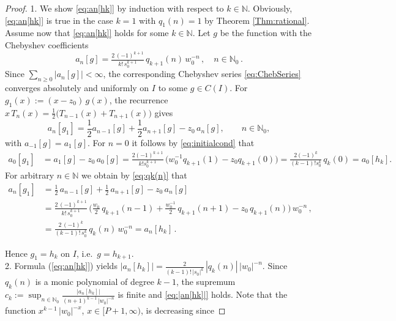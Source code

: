 \documentclass[11pt,a4paper]{scrartcl}
\numberwithin{equation}{section}
\numberwithin{table}{section}
\numberwithin{figure}{section}
\newcommand{\Np}{{\mathbb N}_0}
\begin{document}
\begin{proof} 1. We show \eqref{eq:an[hk]} by induction with respect to $k \in \mathbb N$. Obviously, \eqref{eq:an[hk]} is true in the case $k =1$ with $q_1(n)=1$ by Theorem \ref{Thm:rational}. Assume now that
\eqref{eq:an[hk]} holds for some $k \in \mathbb N$. Let $g$ be the function with the Chebyshev coefficients
$$
a_n[g] = \tfrac{2\,(-1)^{k+1}}{k!\,s_0^{k+1}}\,q_{k+1}(n)\,w_0^{-n}\,,\quad n\in {\mathbb N}_0\,.
$$
Since $\sum_{n\ge0}|a_n[g]| < \infty$, the corresponding Chebyshev series \eqref{eq:ChebSeries}
converges absolutely and uniformly on $I$ to some $g \in C(I)$. For $g_1(x) := (x-z_0)\,g(x)$,
the recurrence $x\,T_n(x) = \frac12\big(T_{n-1}(x)+T_{n+1}(x)\big)$ gives 
$$ \textstyle a_n[g_1] = \frac12 a_{n-1}[g] + \frac12 a_{n+1}[g] - z_0\,a_n[g], \qquad n \in \Np, $$
 with
$a_{-1}[g] = a_1[g]$.   For $n=0$ it follows by \eqref{eq:initialcond} that
\begin{align*}
\textstyle a_0[g_1] &= a_1[g] \!- \!z_0\,a_0[g] =
 \tfrac{2(-1)^{k+1}}{k!s_0^{k+1}}\,\big(w_0^{-1}q_{k+1}(1) \!- \!z_0q_{k+1}(0)\big)
= \tfrac{2(-1)^k}{(k-1)!s_0^k}\,q_k(0) = a_0[{h_k}].
\end{align*}
For arbitrary $n \in \mathbb N$ we obtain by \eqref{eq:qk(n)} that
\begin{align*}
a_n[g_1] &=   \textstyle \tfrac12\,a_{n-1}[g] + \tfrac12\,a_{n+1}[g] - z_0\,a_n[g]\\
&= \textstyle  \tfrac{2\,(-1)^{k+1}}{k!\,s_0^{k+1}}\,\big(\tfrac{w_0}{2}\,q_{k+1}(n-1) + \tfrac{w_0^{-1}}{2}\,q_{k+1}(n+1) - z_0\,q_{k+1}(n)\big)\,w_0^{-n}\,,\\
&= \textstyle  \tfrac{2\,(-1)^k}{(k-1)!\,s_0^k}\,q_k(n)\,w_0^{-n} = a_n[{h_k}]\,.
\end{align*}

Hence
$g_1 = h_k$ on $I$, i.e.\ $g = h_{k+1}$.\\
2. Formula (\ref{eq:an[hk]}) yields  $|a_n[h_k]| = \tfrac{2}{(k-1)!\,|s_0|^k}\,|q_k(n)|\,|w_0|^{-n}$.
Since $q_k(n)$ is a monic polynomial of degree $k-1$, the supremum
$c_k:= \sup_{n \in \Np} \frac{|a_n[h_k]| }{(n+1)^{k-1} \,|w_0|^{-n}}$ is finite
and \eqref{eq:|an[hk]|} holds. Note that the function $x^{k-1}\,|w_0|^{-x}$, $x\in [P+1, \infty)$, is decreasing since


\end{proof}
\end{document}
